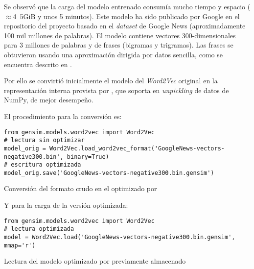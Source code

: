 Se observó que la carga del modelo entrenado  consumía mucho tiempo y espacio ($\approx$\si{4.5}{GiB} y unos 5 minutos). Este modelo ha sido publicado por Google en el repositorio del proyecto  basado en el \emph{dataset} de Google News (aproximadamente 100 mil millones de palabras). El modelo contiene vectores 300-dimensionales para 3 millones de palabras y de frases (bigramas y trigramas). Las frases se obtuvieron usando una aproximación dirigida por datos sencilla, como se encuentra descrito en \cite{DBLP:journals/corr/MikolovSCCD13}.

Por ello se convirtió inicialmente el modelo del \emph{Word2Vec} original en la representación interna provista por , que soporta en \emph{unpickling} de datos de NumPy, de mejor desempeño.

El procedimiento para la conversión es:

\begin{listing}[H]
\begin{verbatim}
from gensim.models.word2vec import Word2Vec
# lectura sin optimizar
model_orig = Word2Vec.load_word2vec_format('GoogleNews-vectors-negative300.bin', binary=True)
# escritura optimizada
model_orig.save('GoogleNews-vectors-negative300.bin.gensim')
\end{verbatim}
\caption{Conversión del formato crudo  en el optimizado por }
\label{lst:word2vec-convert}
\end{listing}

Y para la carga de la versión optimizada:

\begin{listing}[H]
\begin{verbatim}
from gensim.models.word2vec import Word2Vec
# lectura optimizada
model = Word2Vec.load('GoogleNews-vectors-negative300.bin.gensim', mmap='r')
\end{verbatim}
\caption{Lectura del modelo optimizado por  previamente almacenado}
\label{lst:word2vec-convert}
\end{listing}

